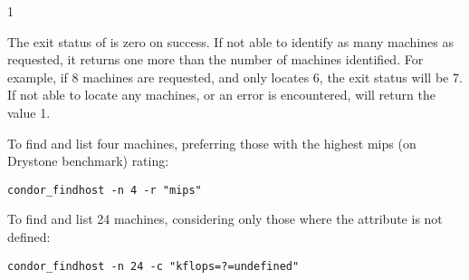 \begin{ManPage}{\label{man-condor-findhost}}{1}
\ExitStatus

The exit status of  is zero on success.
If not able to identify as many machines as requested,
it returns one more than the number of machines identified.
For example, if 8 machines are requested, and 
only locates 6, the exit status will be 7.
If not able to locate any machines, or an error is encountered,
 will return the value 1.

\Examples
To find and list four machines, preferring those with the highest
mips (on Drystone benchmark) rating:
\begin{verbatim}
condor_findhost -n 4 -r "mips"
\end{verbatim}
To find and list 24 machines, considering only those
where the  attribute is not defined:
\begin{verbatim}
condor_findhost -n 24 -c "kflops=?=undefined"
\end{verbatim}

\end{ManPage}


